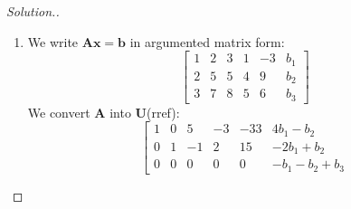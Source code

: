 \begin{enumerate}
\begin{proof}[Solution.]
\begin{enumerate}
\[\begin{aligned}
x_1&=3-5x_3+3x_4+33x_5\\
x_2&=-1+x_3-2x_4-15x_5
\end{aligned}\right.
\]
Hence all solutions is given by
\[
\bm x = \begin{pmatrix}
x_1\\x_2\\x_3\\x_4\\x_5
\end{pmatrix} = \begin{pmatrix}
3-5x_3+3x_4+33x_5\\-1+x_3-2x_4-15x_5\\x_3\\x_4\\x_5
\end{pmatrix} = \begin{pmatrix}
3\\-1\\0\\0\\0
\end{pmatrix}+
x_3\begin{pmatrix}
-5\\1\\1\\0\\0
\end{pmatrix}+
x_4\begin{pmatrix}
3\\-2\\0\\1\\0
\end{pmatrix}+x_5\begin{pmatrix}
33\\-15\\0\\0\\1
\end{pmatrix}
\]
where $x_3,x_4,x_5$ can be taken arbitrarily.
\item
We write $\bm{Ax} = \bm b$ in argumented matrix form:
\[
\left[\begin{array}{ccccc|c}
1&2&3&1&-3&b_1\\2&5&5&4&9&b_2\\3&7&8&5&6&b_3
\end{array}\right]
\]
We convert $\bm A$ into $\bm U$(rref):
\[
\left[\begin{array}{ccccc|c}
1&0&5&-3&-33&4b_1-b_2
\\0&1&-1&2&15&-2b_1+b_2
\\0&0&0&0&0&-b_1-b_2+b_3

\end{array}\]
\end{enumerate}
\end{proof}
\end{enumerate}
